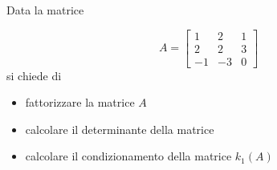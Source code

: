 Data la matrice

\bigskip
\[
A=\left[
\begin{array}{ccc}
1 & 2 & 1 \\
2 & 2 & 3\\
-1 & -3 & 0
\end{array}\right]
\]
si chiede di
\begin{itemize}
\item
fattorizzare la matrice $A$
\item
calcolare il determinante della matrice
\item
calcolare il condizionamento della matrice $k_1(A)$
\end{itemize} 